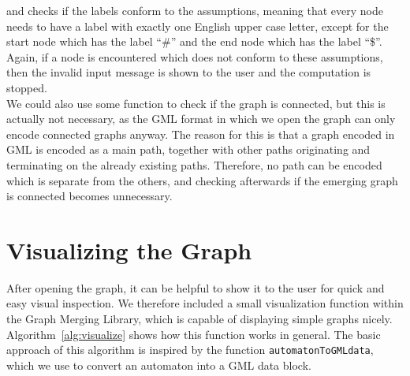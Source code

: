 \documentclass[a4paper,12pt,twoside,BCOR=10mm]{scrbook}
\begin{document}
and checks if the labels conform to the assumptions, meaning that every node needs to have a
label with exactly one English upper case letter, except for the start node which has the label “$\#$” and
the end node which has the label “\$”.
Again, if a node is encountered which does not conform to these assumptions, then the invalid input message
is shown to the user and the computation is stopped. \\
We could also use some function to check if the graph is connected,
but this is actually not necessary, as the GML format in which we open the graph can only encode connected
graphs anyway. The reason for this is that a graph encoded in GML is encoded as a main path,
together with other paths originating and terminating on the already existing paths.
Therefore, no path can be encoded which is separate from the others, and checking afterwards if
the emerging graph is connected becomes unnecessary.

\section{Visualizing the Graph}
%

After opening the graph, it can be helpful to show it to the user for
quick and easy visual inspection.
We therefore included a small visualization function within the Graph Merging Library,
which is capable of displaying simple graphs nicely.
Algorithm~\ref{alg:visualize} shows how this function works in general.
The basic approach of this algorithm is inspired by the function \texttt{automatonToGMLdata},
which we use to convert an automaton into a GML data block.

\pagebreak
\end{document}
